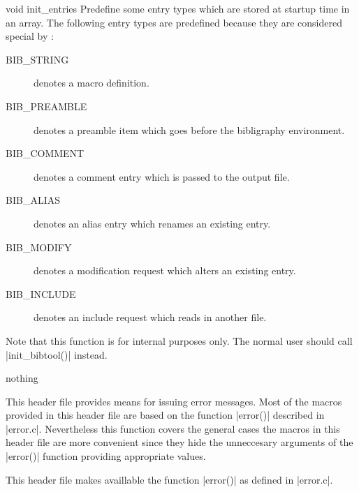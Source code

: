 \begin{Function}{void }{init\_entries}  Predefine some entry types which are stored at startup time
  in an array. The following entry types are predefined
  because they are considered special by \BibTeX:
  \begin{description}
  \item [BIB\_STRING] denotes a \BibTeX{} macro definition.
  \item [BIB\_PREAMBLE] denotes a preamble item which goes
  before the bibligraphy environment.  
  \item [BIB\_COMMENT] denotes a comment entry which is
  passed to the output file.
  \item [BIB\_ALIAS] denotes an alias entry which renames an
  existing entry.
  \item [BIB\_MODIFY] denotes a modification request which
  alters an existing entry.
  \item [BIB\_INCLUDE] denotes an include request which reads
  in another \BibTeX{} file.
  \end{description}
  Note that this function is for internal purposes
  only. The normal user should call |init_bibtool()|
  instead.
  \begin{Result}
    nothing
  \end{Result}
\end{Function}


This header file provides means for issuing error
messages. Most of the macros provided in this header file are
based on the function |error()| described in |error.c|.
Nevertheless this function covers the general cases the macros
in this header file are more convenient since they hide the
unneccesary arguments of the |error()| function providing
appropriate values.

This header file makes availlable the function |error()| as
defined in |error.c|.

